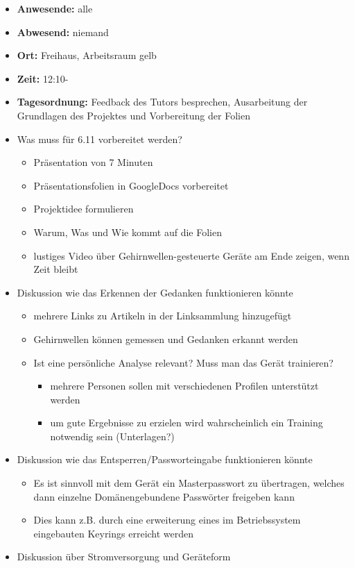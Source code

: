 \begin{itemize}
\item
  \textbf{Anwesende:} alle
\item
  \textbf{Abwesend:} niemand
\item
  \textbf{Ort:} Freihaus, Arbeitsraum gelb
\item
  \textbf{Zeit:} 12:10-
\item
  \textbf{Tagesordnung:} Feedback des Tutors besprechen, Ausarbeitung
  der Grundlagen des Projektes und Vorbereitung der Folien
\item
  Was muss für 6.11 vorbereitet werden?

  \begin{itemize}
  \itemsep1pt\parskip0pt
  \item
    Präsentation von 7 Minuten
  \item
    Präsentationsfolien in GoogleDocs vorbereitet
  \item
    Projektidee formulieren
  \item
    Warum, Was und Wie kommt auf die Folien
  \item
    lustiges Video über Gehirnwellen-gesteuerte Geräte am Ende zeigen,
    wenn Zeit bleibt
  \end{itemize}
\item
  Diskussion wie das Erkennen der Gedanken funktionieren könnte

  \begin{itemize}
  \itemsep1pt\parskip0pt
  \item
    mehrere Links zu Artikeln in der Linksammlung hinzugefügt
  \item
    Gehirnwellen können gemessen und Gedanken erkannt werden
  \item
    Ist eine persönliche Analyse relevant? Muss man das Gerät
    trainieren?

    \begin{itemize}
    \itemsep1pt\parskip0pt
    \item
      mehrere Personen sollen mit verschiedenen Profilen unterstützt
      werden
    \item
      um gute Ergebnisse zu erzielen wird wahrscheinlich ein Training
      notwendig sein (Unterlagen?)
    \end{itemize}
  \end{itemize}
\item
  Diskussion wie das Entsperren/Passworteingabe funktionieren könnte

  \begin{itemize}
  \itemsep1pt\parskip0pt
  \item
    Es ist sinnvoll mit dem Gerät ein Masterpasswort zu übertragen,
    welches dann einzelne Domänengebundene Passwörter freigeben kann
  \item
    Dies kann z.B. durch eine erweiterung eines im Betriebssystem
    eingebauten Keyrings erreicht werden
  \end{itemize}
\item
  Diskussion über Stromversorgung und Geräteform


\end{itemize}
